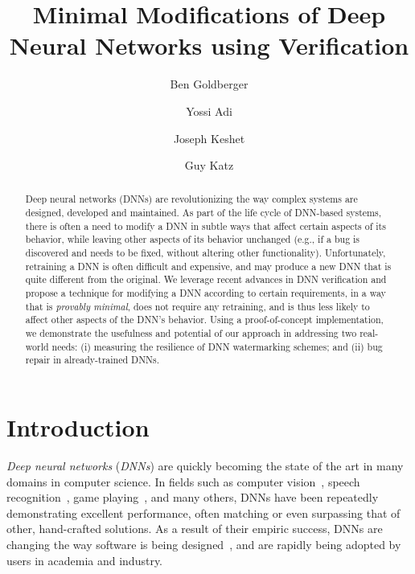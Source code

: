 \documentclass{easychair}
\begin{document}
\title{Minimal Modifications of Deep Neural Networks using Verification}
\author{
Ben Goldberger \and
Yossi Adi \and
Joseph Keshet \and
Guy Katz
}

\maketitle


\begin{abstract}
  Deep neural networks (DNNs) are revolutionizing the way complex
  systems are designed, developed and maintained. As part of the life cycle of
  DNN-based systems, there is often a need to modify a DNN in subtle
  ways that affect certain aspects of its behavior, while leaving
  other aspects of its behavior unchanged (e.g., if a bug is discovered and needs to
  be fixed, without altering other functionality). Unfortunately,
  retraining a DNN is often difficult and expensive, and may produce a new
  DNN that is quite different from the original.
  We leverage recent
  advances in DNN verification and propose a technique for modifying
  a DNN according to certain requirements, in a way that is
  \emph{provably minimal}, does not require any retraining, and is
  thus less likely to
  affect other aspects of the DNN's behavior. Using a proof-of-concept
  implementation, we demonstrate the usefulness and potential of
  our approach in addressing two real-world needs: (i) measuring the
  resilience of DNN watermarking schemes; and (ii) bug repair in
  already-trained DNNs.
\end{abstract}

\section{Introduction}
\label{sec:introduction}


\emph{Deep neural networks} (\emph{DNNs}) are quickly becoming the
state of the art in many domains in computer science.  In fields such
as computer vision~\cite{KrSuHi12}, speech
recognition~\cite{HiDeYuDaMoJaSeVaNgSaKi12}, game
playing~\cite{SiHuMaGuSiVaScAnPaLaDi16}, and many others, DNNs have
been repeatedly demonstrating excellent performance, often matching or
even surpassing that of other, hand-crafted solutions.  As a result of
their empiric success, DNNs are changing the way software is being
designed~\cite{GoSoTaCaRiBaAmTeMa18}, and are rapidly being adopted by
users in academia and industry.
\end{document}
